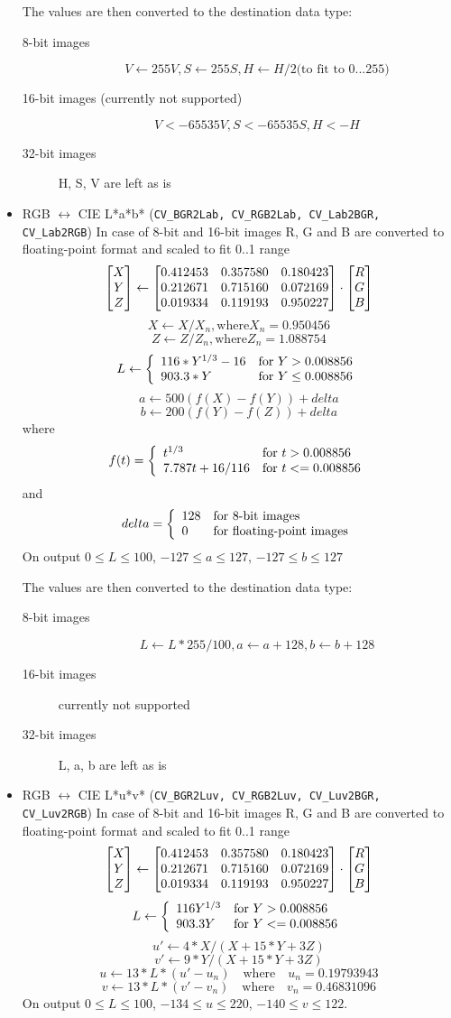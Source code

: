 \begin{itemize}
The values are then converted to the destination data type:
\begin{description}
\item[8-bit images]
\[ V \leftarrow 255 V, S \leftarrow 255 S, H \leftarrow H/2 \text{(to fit to 0...255)} \]
\item[16-bit images (currently not supported)]
\[ V <- 65535 V, S <- 65535 S, H <- H \]
\item[32-bit images]
H, S, V are left as is
\end{description}

 \item RGB $\leftrightarrow$ CIE L*a*b* (\texttt{CV\_BGR2Lab, CV\_RGB2Lab, CV\_Lab2BGR, CV\_Lab2RGB})
  In case of 8-bit and 16-bit images
  R, G and B are converted to floating-point format and scaled to fit 0..1 range
\[ \begin{bmatrix} X\\ Y\\ Z \end{bmatrix} \leftarrow \begin{bmatrix} 0.412453 & 0.357580 & 0.180423\\ 0.212671 & 0.715160 & 0.072169\\ 0.019334 & 0.119193 & 0.950227 \end{bmatrix}
\cdot
\begin{bmatrix} R\\ G\\ B \end{bmatrix} \]
\[ X \leftarrow X/X_n, \text{where} X_n = 0.950456 \]
\[ Z \leftarrow Z/Z_n, \text{where} Z_n = 1.088754 \]
\[ L \leftarrow \left\{ \begin{array}{l l} 116*Y^{1/3}-16 & \mbox{for $Y>0.008856$}\\ 903.3*Y & \mbox{for $Y \le 0.008856$}\\ \end{array} \right. \]
\[ a \leftarrow 500 (f(X)-f(Y)) + delta \]
\[ b \leftarrow 200 (f(Y)-f(Z)) + delta \]
where
\[f(t)=\left\{ \begin{array}{l l} t^{1/3} & \mbox{for $t>0.008856$}\\ 7.787 t+16/116 & \mbox{for $t<=0.008856$}\\ \end{array} \right. \]
and
\[ delta = \left\{ \begin{array}{l l} 128 & \mbox{for 8-bit images}\\ 0 & \mbox{for floating-point images}\\ \end{array} \right. \]
On output $0 \leq L \leq 100$, $-127 \leq a \leq 127$, $-127 \leq b \leq 127$

The values are then converted to the destination data type:
\begin{description}
\item[8-bit images]
\[L \leftarrow L*255/100, a \leftarrow a + 128, b \leftarrow b + 128\]
\item[16-bit images] currently not supported
\item[32-bit images]
L, a, b are left as is
\end{description}

 \item RGB $\leftrightarrow$ CIE L*u*v* (\texttt{CV\_BGR2Luv, CV\_RGB2Luv, CV\_Luv2BGR, CV\_Luv2RGB})
  In case of 8-bit and 16-bit images
  R, G and B are converted to floating-point format and scaled to fit 0..1 range
  \[ \begin{bmatrix} X\\ Y\\ Z \end{bmatrix} \leftarrow \begin{bmatrix} 0.412453 & 0.357580 & 0.180423\\ 0.212671 & 0.715160 & 0.072169\\ 0.019334 & 0.119193 & 0.950227 \end{bmatrix}
\cdot
\begin{bmatrix} R\\ G\\ B \end{bmatrix} \]
\[ L \leftarrow \left\{ \begin{array}{l l} 116 Y^{1/3} & \mbox{for $Y>0.008856$}\\ 903.3 Y & \mbox{for $Y<=0.008856$}\\ \end{array} \right. \]
\[ u' \leftarrow 4*X/(X + 15*Y + 3 Z) \]
\[ v' \leftarrow 9*Y/(X + 15*Y + 3 Z) \]
\[ u \leftarrow 13*L*(u' - u_n) \quad \text{where} \quad u_n=0.19793943 \]
\[ v \leftarrow 13*L*(v' - v_n) \quad \text{where} \quad v_n=0.46831096 \]
On output $0 \leq L \leq 100$, $-134 \leq u \leq 220$, $-140 \leq v \leq 122$.


\end{itemize}
